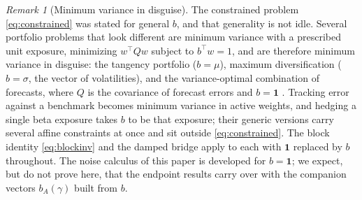 \documentclass[11pt]{article}
\theoremstyle{remark}
\newtheorem{remark}{Remark}
\begin{document}
\begin{remark}[Minimum variance in disguise]
\label{rem:disguise}
The constrained problem \eqref{eq:constrained} was stated for general
$b$, and that generality is not idle. Several portfolio problems that look
different are minimum variance with a prescribed unit exposure, minimizing
$w^\top Q w$ subject to $b^\top w = 1$, and are therefore minimum variance
in disguise: the tangency portfolio ($b = \mu$), maximum diversification
($b = \sigma$, the vector of volatilities), and the variance-optimal
combination of forecasts, where $Q$ is the covariance of forecast errors
and $b = \mathbf{1}$ \cite{bates1969}. Tracking error against a benchmark
becomes minimum variance in active weights, and hedging a single beta
exposure takes $b$ to be that exposure; their generic versions carry
several affine constraints at once and sit outside \eqref{eq:constrained}. The block identity
\eqref{eq:blockinv} and the damped bridge apply to each with $\mathbf{1}$
replaced by $b$ throughout. The noise calculus of this paper is developed
for $b = \mathbf{1}$; we expect, but do not prove here, that the endpoint
results carry over with the companion vectors $b_A(\gamma)$ built from $b$.
\end{remark}
\end{document}
